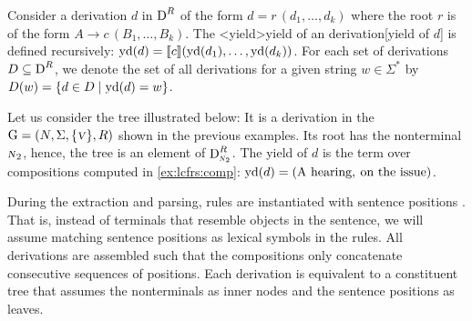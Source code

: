 \documentclass[../../document.tex]{subfiles}
\begin{document}
    \begin{definition}[Yield]
        Consider a derivation \(d\) in \(\operatorname{D}^R\) of the form \(d = r\,(d_1, \ldots, d_k)\) where the root \(r\) is of the form \(A \to c\,(B_1, \ldots, B_k)\).
        The <yield>{yield of an  derivation}[yield of \(d\)] is defined recursively: \(\operatorname{yd}(d) = \llbracket c\rrbracket(\operatorname{yd}(d_1), \ldots, \operatorname{yd}(d_k))\).
        For each set of derivations \(D \subseteq \operatorname{D}^R\), we denote the set of all derivations for a given string \(w \in \varSigma^*\) by \(D(w) = \{d\in D \mid \operatorname{yd}(d) = w\}\).
    \end{definition}

    \begin{example}\label{ex:lcfrs:deriv}\NoEndMark
        Let us consider the tree illustrated below:
            It is a derivation in the  \(\mathrm{G} = (N, \Sigma, \{\textsc{\textsl{v}}\}, R)\) shown in the previous examples.
        Its root has the  nonterminal \(\textsc{\textsl{n}}_2\), hence, the tree is an element of \(\operatorname{D}^R_{\textsc{\textsl{n}}_2}\).
        The yield of \(d\) is the term over compositions computed in \cref{ex:lcfrs:comp}: \(\operatorname{yd}(d) = (\text{A hearing}, \: \text{on the issue})\).
        
        \null\hfill
        \hfill
        \exampleqed
    \end{example}

    During the extraction and parsing,  rules are instantiated with sentence positions \citep[Definition~6.8]{Kal10}.
    That is, instead of terminals that resemble objects in the sentence, we will assume matching sentence positions as lexical symbols in the rules.
    All derivations are assembled such that the compositions only concatenate consecutive sequences of positions.
    Each derivation is equivalent to a constituent tree that assumes the  nonterminals as inner nodes and the sentence positions as leaves.
\end{document}
